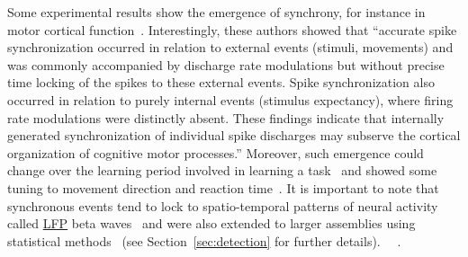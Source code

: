 \documentclass[brainsci, %
               review,submit,pdftex,moreauthors
               ]{Definitions/mdpi}
\begin{document}
Some experimental results show the emergence of synchrony, for instance in motor cortical function~\citep{riehle_spike_1997}. Interestingly, these authors showed that ``accurate spike synchronization occurred in relation to external events (stimuli, movements) and was commonly accompanied by discharge rate modulations but without precise time locking of the spikes to these external events. Spike synchronization also occurred in relation to purely internal events (stimulus expectancy), where firing rate modulations were distinctly absent. These findings indicate that internally generated synchronization of individual spike discharges may subserve the cortical organization of cognitive motor processes.'' Moreover, such emergence could change over the learning period involved in learning a task~\citep{kilavik_long-term_2009} and showed some tuning to movement direction and reaction time~\citep{grammont_spike_2003}. It is important to note that synchronous events tend to lock to spatio-temporal patterns of neural activity called \href{https://en.wikipedia.org/wiki/Local_field_potential}{LFP} beta waves~\citep{denker_lfp_2018} and were also extended to larger assemblies using statistical methods~\citep{torre_asset_2016} (see Section~\ref{sec:detection} for further details). ~\citep{ben-yishai_traveling_1997}~\citep{bruno_cortex_2006}. 
\end{document}
